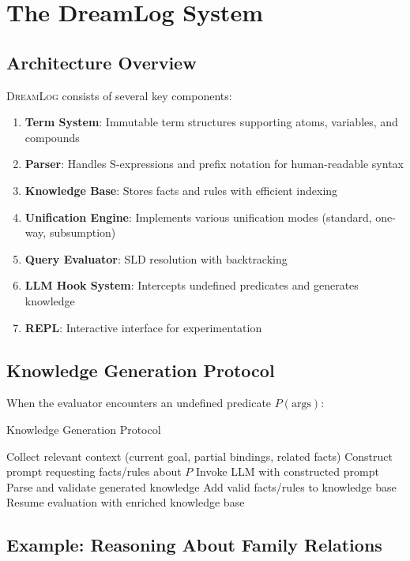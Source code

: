 \documentclass[11pt,a4paper]{article}
\newcommand{\dreamlog}{\textsc{DreamLog}}
\begin{document}
\section{The DreamLog System}

\subsection{Architecture Overview}

\dreamlog{} consists of several key components:

\begin{enumerate}
\item \textbf{Term System}: Immutable term structures supporting atoms, variables, and compounds
\item \textbf{Parser}: Handles S-expressions and prefix notation for human-readable syntax
\item \textbf{Knowledge Base}: Stores facts and rules with efficient indexing
\item \textbf{Unification Engine}: Implements various unification modes (standard, one-way, subsumption)
\item \textbf{Query Evaluator}: SLD resolution with backtracking
\item \textbf{LLM Hook System}: Intercepts undefined predicates and generates knowledge
\item \textbf{REPL}: Interactive interface for experimentation
\end{enumerate}

\subsection{Knowledge Generation Protocol}

When the evaluator encounters an undefined predicate $P(\text{args})$:

\begin{algorithm}
\caption{Knowledge Generation Protocol}
\begin{algorithmic}[1]
\STATE Collect relevant context (current goal, partial bindings, related facts)
\STATE Construct prompt requesting facts/rules about $P$
\STATE Invoke LLM with constructed prompt
\STATE Parse and validate generated knowledge
\STATE Add valid facts/rules to knowledge base
\STATE Resume evaluation with enriched knowledge base
\end{algorithmic}
\end{algorithm}

\subsection{Example: Reasoning About Family Relations}
\end{document}
